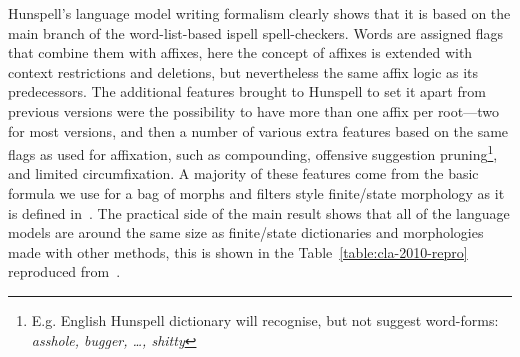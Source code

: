 \documentclass[officiallayout]{unihelcompling}
\begin{document}
Hunspell's language model writing formalism clearly shows that it is based on
the main branch of the word-list-based ispell spell-checkers. Words are
assigned flags that combine them with affixes, here the concept of affixes is
extended with context restrictions and deletions, but nevertheless the same
affix logic as its predecessors. The additional features brought to Hunspell to
set it apart from previous versions were the possibility to have more than one
affix per root---two for most versions, and then a number of various extra
features based on the same flags as used for affixation, such as compounding,
offensive suggestion pruning\footnote{E.g. English Hunspell dictionary will
    recognise, but not suggest word-forms: \emph{asshole, bugger, \ldots,
shitty}}, and limited circumfixation.  A majority of these features come from
the basic formula we use for a bag of morphs and filters style finite\-/state
morphology as it is defined in~\citet{linden2009hfst}. The practical side of
the main result shows that all of the language models are around the same size
as finite\-/state dictionaries and morphologies made with other methods, this
is shown in the Table~\ref{table:cla-2010-repro} reproduced
from~.
\end{document}
